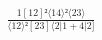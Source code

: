 \documentclass[varwidth, border=5pt]{standalone}
\begin{document}
\begin{my}
$\begin{gathered}
\scriptscriptstyle\frac{1[12]²⟨14⟩²⟨23⟩}{⟨12⟩²[23]⟨2|1+4|2]}
\end{gathered}$
\end{my}
\end{document}

